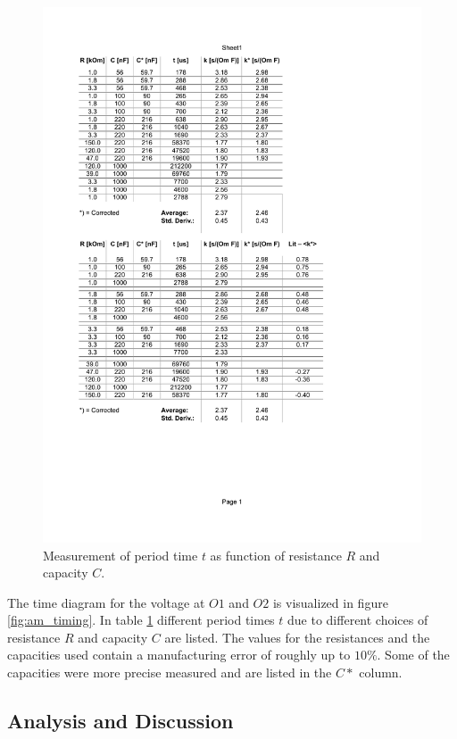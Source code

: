 \documentclass[journal]{IEEEtran}
\begin{document}
\begin{figure}
  \centering
   \includegraphics[trim=20mm 63mm 55mm 130mm, clip,
   width=\columnwidth]{results/am_data.pdf}
   \caption{Measurement of period time $t$ as function of resistance $R$ and
   capacity $C$.}
   \label{fig:am_result}
\end{figure}


The time diagram for the voltage at $O1$ and $O2$ is visualized in figure
\ref{fig:am_timing}. In table \ref{fig:am_result} different period times $t$ due 
to different choices of resistance $R$ and capacity $C$ are listed. The values
for the resistances and the capacities used contain a manufacturing
error of roughly up to $10\%$. Some of the capacities were more precise
measured and are listed in the $C*$ column.

\subsection{Analysis and Discussion}
\end{document}
